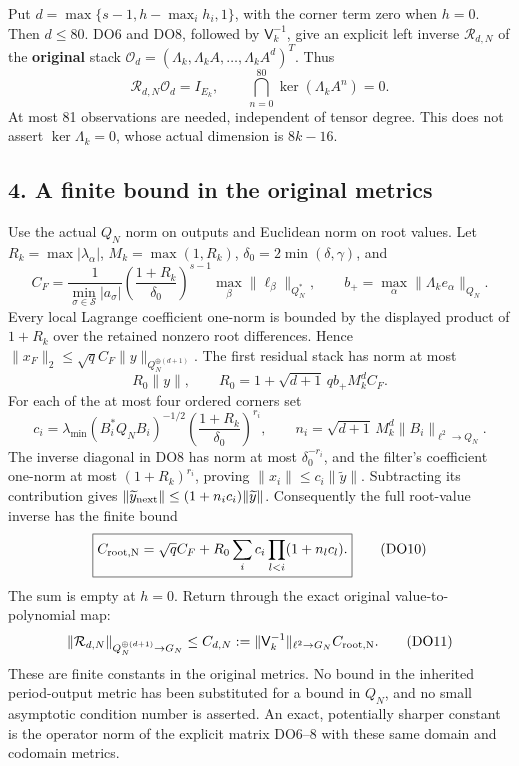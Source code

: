 Put \(d=\max\{s-1,h-\max_i h_i,1\}\), with the corner term zero when \(h=0\). Then \(d\le80\). DO6 and DO8, followed by \(\mathsf V_k^{-1}\), give an explicit left inverse \(\mathcal R_{d,N}\) of the \textbf{original} stack \(\mathcal O_d=(\Lambda_k,\Lambda_k A,\ldots,\Lambda_k A^d)^T\). Thus \[
\boxed{\displaystyle
\mathcal R_{d,N}\mathcal O_d=I_{E_k},\qquad
\bigcap_{n=0}^{80}\ker(\Lambda_k A^n)=0.}
\tag{DO9}
\] At most 81 observations are needed, independent of tensor degree. This does not assert \(\ker\Lambda_k=0\), whose actual dimension is \(8k-16\).

\subsection{4. A finite bound in the original metrics}\label{pdepth:a-finite-bound-in-the-original-metrics}

Use the actual \(Q_N\) norm on outputs and Euclidean norm on root values. Let \(R_k=\max|\lambda_\alpha|\), \(M_k=\max(1,R_k)\), \(\delta_0=2\min(\delta,\gamma)\), and \[
C_F=\frac1{\min_{\sigma\in\mathcal S}|a_\sigma|}
\left(\frac{1+R_k}{\delta_0}\right)^{s-1}
\max_\beta\|\ell_\beta\|_{Q_N^*},\qquad
b_+=\max_\alpha\|\Lambda_k e_\alpha\|_{Q_N}.
\] Every local Lagrange coefficient one-norm is bounded by the displayed product of \(1+R_k\) over the retained nonzero root differences. Hence \(\|x_F\|_2\le\sqrt q C_F\|y\|_{Q_N^{\oplus(d+1)}}\). The first residual stack has norm at most \[
R_0\|y\|,\qquad
R_0=1+\sqrt{d+1}\,q b_+M_k^d C_F.
\] For each of the at most four ordered corners set \[
c_i=\lambda_{\min}(B_i^*Q_NB_i)^{-1/2}
\left(\frac{1+R_k}{\delta_0}\right)^{r_i},\qquad
n_i=\sqrt{d+1}\,M_k^d\|B_i\|_{\ell^2\to Q_N}.
\] The inverse diagonal in DO8 has norm at most \(\delta_0^{-r_i}\), and the filter's coefficient one-norm at most \((1+R_k)^{r_i}\), proving \(\|x_i\|\le c_i\|\widetilde y\|\). Subtracting its contribution gives \(\|\widetilde y_{\rm next}\|\le(1+n_ic_i)\|\widetilde y\|\). Consequently the full root-value inverse has the finite bound \[
\boxed{\displaystyle
C_{\rm root,N}=\sqrt q C_F+
R_0\sum_i c_i\prod_{l<i}(1+n_lc_l).}
\tag{DO10}
\] The sum is empty at \(h=0\). Return through the exact original value-to-polynomial map: \[
\|\mathcal R_{d,N}\|_{Q_N^{\oplus(d+1)}\to G_N}
\le C_{d,N}:=\|\mathsf V_k^{-1}\|_{\ell^2\to G_N}C_{\rm root,N}.
\tag{DO11}
\] These are finite constants in the original metrics. No bound in the inherited period-output metric has been substituted for a bound in \(Q_N\), and no small asymptotic condition number is asserted. An exact, potentially sharper constant is the operator norm of the explicit matrix DO6--8 with these same domain and codomain metrics.

